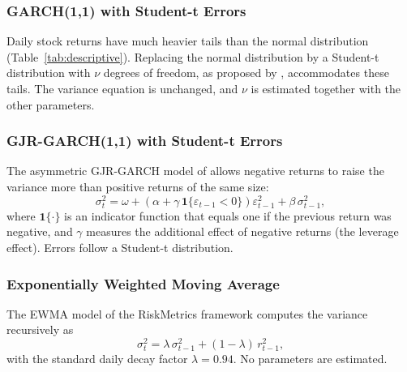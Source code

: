 \documentclass[12pt,a4paper]{article}
\begin{document}
\subsubsection{GARCH(1,1) with Student-t Errors}\label{sec:garch-t}
Daily stock returns have much heavier tails than the normal distribution (Table~\ref{tab:descriptive}). Replacing the normal distribution by a Student-t distribution with $\nu$ degrees of freedom, as proposed by \textcite{bollerslev1987}, accommodates these tails. The variance equation is unchanged, and $\nu$ is estimated together with the other parameters.

\subsubsection{GJR-GARCH(1,1) with Student-t Errors}\label{sec:gjr}
The asymmetric GJR-GARCH model of \textcite{glosten1993} allows negative returns to raise the variance more than positive returns of the same size:
\begin{equation}
  \sigma_t^2 = \omega + \left(\alpha + \gamma\,\mathbf{1}\{\varepsilon_{t-1} < 0\}\right)\varepsilon_{t-1}^2 + \beta\,\sigma_{t-1}^2,
  \label{eq:gjr}
\end{equation}
where $\mathbf{1}\{\cdot\}$ is an indicator function that equals one if the previous return was negative, and $\gamma$ measures the additional effect of negative returns (the leverage effect). Errors follow a Student-t distribution.

\subsubsection{Exponentially Weighted Moving Average}\label{sec:ewma}
The EWMA model of the RiskMetrics framework \parencite{riskmetrics1996} computes the variance recursively as
\begin{equation}
  \sigma_t^2 = \lambda\,\sigma_{t-1}^2 + (1 - \lambda)\,r_{t-1}^2,
  \label{eq:ewma}
\end{equation}
with the standard daily decay factor $\lambda = 0.94$. No parameters are estimated.
\end{document}
